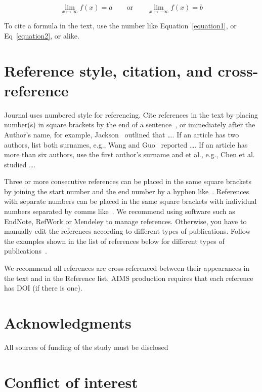 \documentclass{aims}
\numberwithin{equation}{section}
\theoremstyle{definition}
\begin{document}
\begin{equation}
\lim_{x \mapsto \infty }f\left ( x \right )=  a \qquad \text{or} \qquad \lim_{x \mapsto -\infty}f\left ( x \right )=  b
\label{equation2}
\end{equation}

To cite a formula in the text, use the number like Equation~\ref{equation1}, or Eq~\ref{equation2}, or alike.



\section{Reference style, citation, and cross-reference}
Journal uses numbered style for referencing. Cite references in the text by placing number(s) in square brackets by the end of a sentence~\cite{A1,A2}, or immediately after the Author’s name, for example, Jackson~\cite{A3} outlined that …. If an article has two authors, list both surnames, e.g., Wang and Guo~\cite{A4} reported …. If an article has more than six authors, use the first author’s surname and et al., e.g., Chen et al.~\cite{A9} studied ….

Three or more consecutive references can be placed in the same square brackets by joining the start number and the end number by a hyphen like~\cite{A5,A6,A7,A8}. References with separate numbers can be placed in the same square brackets with individual numbers separated by comms like~\cite{A2,A6,A9}. We recommend using software such as EndNote, RefWork or Mendeley to manage references. Otherwise, you have to manually edit the references according to different types of publications. Follow the examples shown in the list of references below for different types of publications~\cite{A10,A11,A12}.

We recommend all references are cross-referenced between their appearances in the text and in the Reference list. AIMS production requires that each reference has DOI (if there is one).

\section*{Acknowledgments}

All sources of funding of the study must be disclosed

\section*{Conflict of interest}
\end{document}
